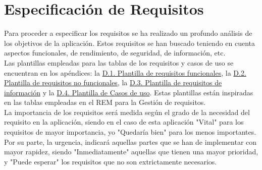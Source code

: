 \chapter{Especificación de Requisitos}
\label{enlaceespecificacion}

Para proceder a especificar los requisitos se ha realizado un profundo análisis de los objetivos de la aplicación. Estos requisitos se han buscado teniendo en cuenta aspectos funcionales, de rendimiento, de seguridad, de información, etc.
\\

Las plantillas empleadas para las tablas de los requisitos y casos de uso se encuentran en los apéndices: la \hyperref[enlaceFRQX]{D.1. Plantilla de requisitos funcionales}, la \hyperref[enlaceNFRX]{D.2. Plantilla de requisitos no funcionales}, la \hyperref[enlaceIRQX]{D.3. Plantilla de requisitos de información} y la \hyperref[enlaceUCX]{D.4. Plantilla de Casos de uso}.
Estas plantillas están inspiradas en las tablas empleadas en el REM \cite{rem} para la Gestión de requisitos.
\\

La importancia de los requisitos será medida según el grado de la necesidad del requisito en la aplicación, siendo en el caso de esta aplicación "Vital" para los requisitos de mayor importancia, yo "Quedaría bien" para los menos importantes. Por su parte, la urgencia, indicará aquellas partes que se han de implementar con mayor rapidez, siendo "Inmediatamente" aquellas que tienen una mayor prioridad, y "Puede esperar" los requisitos que no son extrictamente necesarios.





